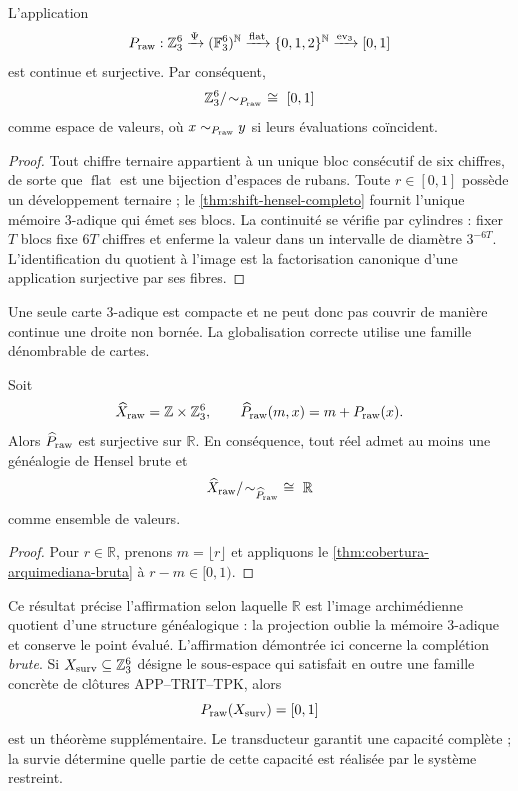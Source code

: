 \begin{theorem}
\label{thm:cobertura-arquimediana-bruta}
L'application
\[
 P_{\rm raw}:\mathbb Z_3^6
 \xrightarrow{\Psi}(\mathbb F_3^6)^{\mathbb N}
 \xrightarrow{\operatorname{flat}}\{0,1,2\}^{\mathbb N}
 \xrightarrow{\operatorname{ev}_3}[0,1]
\]
est continue et surjective. Par conséquent,
\[
 \mathbb Z_3^6/\!\sim_{P_{\rm raw}}
 \ \cong\ [0,1]
\]
comme espace de valeurs, où \(x\sim_{P_{\rm raw}}y\) si leurs évaluations
coïncident.
\end{theorem}

\begin{proof}
Tout chiffre ternaire appartient à un unique bloc consécutif de six chiffres,
de sorte que \(\operatorname{flat}\) est une bijection d'espaces de rubans.
Toute \(r\in[0,1]\) possède un développement ternaire ; le
\cref{thm:shift-hensel-completo} fournit l'unique mémoire 3-adique qui
émet ses blocs. La continuité se vérifie par cylindres : fixer \(T\)
blocs fixe \(6T\) chiffres et enferme la valeur dans un intervalle de diamètre
\(3^{-6T}\). L'identification du quotient à l'image est la factorisation
canonique d'une application surjective par ses fibres.
\end{proof}

Une seule carte 3-adique est compacte et ne peut donc pas couvrir de manière
continue une droite non bornée. La globalisation correcte utilise une famille
dénombrable de cartes.

\begin{corollary}
\label{cor:atlas-hmt-reales}
Soit
\[
 \widehat X_{\rm raw}=\mathbb Z\times\mathbb Z_3^6,
 \qquad
 \widehat P_{\rm raw}(m,x)=m+P_{\rm raw}(x).
\]
Alors \(\widehat P_{\rm raw}\) est surjective sur \(\mathbb R\).
En conséquence, tout réel admet au moins une généalogie de Hensel brute et
\[
 \widehat X_{\rm raw}/\!\sim_{\widehat P_{\rm raw}}
 \ \cong\ \mathbb R
\]
comme ensemble de valeurs.
\end{corollary}

\begin{proof}
Pour \(r\in\mathbb R\), prenons \(m=\lfloor r\rfloor\) et appliquons le
\cref{thm:cobertura-arquimediana-bruta} à \(r-m\in[0,1)\).
\end{proof}

Ce résultat précise l'affirmation selon laquelle \(\mathbb R\) est l'image
archimédienne quotient d'une
structure généalogique : la projection oublie la mémoire 3-adique et conserve
le point évalué. L'affirmation démontrée ici concerne la complétion
\emph{brute}. Si \(X_{\rm surv}\subseteq\mathbb Z_3^6\) désigne le sous-espace
qui satisfait en outre une famille concrète de clôtures APP--TRIT--TPK, alors
\[
 P_{\rm raw}(X_{\rm surv})=[0,1]
\]
est un théorème supplémentaire. Le transducteur garantit une capacité complète ; la
survie détermine quelle partie de cette capacité est réalisée par le système
restreint.

